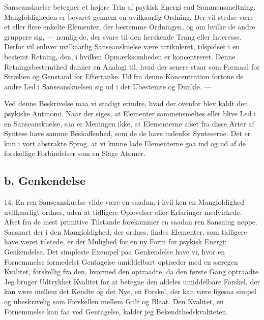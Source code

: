 \documentclass[12pt,a4paper]{book}
\newcommand{\opage}[1]{\marginnote{\footnotesize\textit{[#1]}}}
\begin{document}
Sanseanskuelse betegner et højere Trin af psykisk Energi end
Sammensmeltning. Mangfoldigheden er bevaret gennem en uvilkaarlig
Ordning. Der vil stedse være et eller flere enkelte Elementer, der
bestemme Ordningen, og om hvilke de andre gruppere sig, --- nemlig de,
der svare til den herskende Trang eller Interesse. Derfor vil enhver
uvilkaarlig Sanseanskuelse være artikuleret, tilspidset i en bestemt
Retning, den, i hvilken Opmærksomheden er koncentreret. Denne
Retningsbestemthed danner en Analogi til, hvad der senere staar som
Formaal for Stræben og Genstand for Eftertanke. Ud fra denne
Koncentration fortone de andre Led i Sanseanskuelsen sig ud i det
Ubestemte og Dunkle. ---

Ved denne Beskrivelse maa vi stadigt erindre, hvad der ovenfor blev
kaldt den psykiske Antinomi. Naar der siges, at Elementer sammensmeltes
eller blive Led i en Sanseanskuelse, saa er Meningen ikke, at
Elementerne afset fra disse Arter af Syntese have samme Beskaffenhed, som de de have indenfor Synteserne. Det er kun i vort abstrakte Sprog, at vi
kunne lade Elementerne gaa ind og ud af de forskellige Forbindelser som
en Slags Atomer.

\subsection*{b. Genkendelse}
\label{ssec:genkendelse}

14. En ren Sanseanskuelse vilde være en saadan, i hvil%
\opage{47}ken en
Mangfoldighed uvilkaarligt ordnes, uden at tidligere Oplevelser eller
Erfaringer medvirkede. Afset fra de mest primitive Tilstande forekommer
en saadan ren Sansning neppe. Saasnart der i den Mangfoldighed, der
ordnes, findes Elementer, som tidligere have været tilstede, er der
Mulighed for en ny Form for psykisk Energi: Genkendelse. Det simpleste
Exempel paa Genkendelse have vi, hvor en Fornemmelse formedelst
Gentagelse umiddelbart optræder med en særegen Kvalitet, forskellig fra
den, hvormed den optraadte, da den første Gang optraadte. Jeg bruger
Udtrykket Kvalitet for at betegne den aldeles umiddelbare Forskel, der
kan være mellem det Kendte og det Nye, en Forskel, der kan være ligesaa
simpel og ubeskrivelig som Forskellen mellem Gult og Blaat. Den Kvalitet,
en Fornemmelse kan faa ved Gentagelse, kalder jeg Bekendthedskvaliteten.
\end{document}
